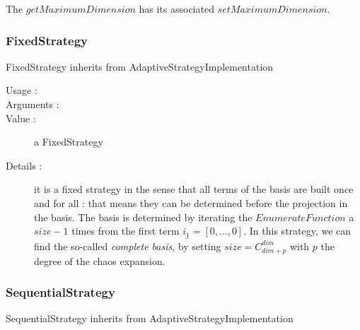 The $getMaximumDimension$ has its associated $setMaximumDimension$.

\newpage      \subsubsection{FixedStrategy}
FixedStrategy inherits from AdaptiveStrategyImplementation
\begin{description}
\item[Usage :] \rule{0pt}{1em}

\item[Arguments :]  \rule{0pt}{1em}

\item[Value :] a FixedStrategy

\item[Details :] it is a fixed strategy in the sense that all terms of the basis are built once and for all :  that means they can be determined before the projection in the basis. The basis is determined by iterating the $EnumerateFunction$ a $size -1$ times from the first term $\underline{i_1}=[0,...,0]$. In this strategy, we can find the so-called \emph{complete basis}, by setting $size = C_{dim+p}^{dim}$ with $p$ the degree of the chaos expansion.
\end{description}






\newpage       \subsubsection{SequentialStrategy}
SequentialStrategy inherits from AdaptiveStrategyImplementation

